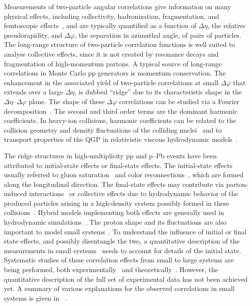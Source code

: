 Measurements of two-particle angular correlations give information on many physical effects, including collectivity, hadronization, fragmentation, and femtoscopic effects~\cite{Lisa:2005dd}, and are typically quantified as a function of $\Delta\eta$, the relative pseudorapidity, and $\Delta\varphi$, the separation in azimuthal angle, of pairs of particles. The long-range structure of two-particle correlation functions is well suited to analyse collective effects, since it is not created by resonance decays and fragmentation of high-momentum partons. A typical source of long-range correlations in Monte Carlo pp generators is momentum conservation. %
The enhancement in the associated yield of two-particle correlations at small $\Delta\varphi$ that extends over a large $\Delta\eta$, is dubbed ``ridge'' due to its characteristic shape in the $\Delta\eta$--$\Delta\varphi$ plane.
The shape of these $\Delta\varphi$ correlations can be studied via a Fourier decomposition~\cite{Poskanzer:1998yz,Voloshin:2008dg}. The second and third order terms are the dominant harmonic coefficients. In heavy-ion collisions, harmonic coefficients can be related to the collision geometry and density fluctuations of the colliding nuclei~\cite{Alver:2010gr,Alver:2010dn,ALICE:2011ab} and to transport properties of the QGP in relativistic viscous hydrodynamic models~\cite{Gale:2012rq,Niemi:2015qia,Shen:2014vra,Bernhard:2016tnd,Bernhard2019}.

The ridge structures in high-multiplicity pp and p--Pb events have been attributed to initial-state effects or final-state effects. The initial-state effects usually referred to gluon saturation~\cite{Dusling:2012cg,Bzdak:2013zma} and color reconnections~\cite{Ortiz:2013yxa,Sarma:2019teo}, which are formed along the longitudinal direction. The final-state effects may contribute via parton-induced interactions~\cite{Arbuzov:2011yr} or collective effects due to hydrodynamic behavior of the produced particles arising in a high-density system possibly formed in these collisions~\cite{Weller:2017tsr,Zhao:2017rgg}. 
Hybrid models implementing both effects are generally used in hydrodynamic simulations~\cite{Greif:2017bnr,Mantysaari:2017cni}. 
The proton shape and its fluctuations are also important to model small systems~\cite{Mantysaari:2017cni}.
To understand the influence of initial or final state effects, and possibly disentangle the two, a quantitative description of the measurements in small systems~\cite{Schenke:2019pmk,Schenke:2020mbo} needs to account for details of the initial state.
Systematic studies of these correlation effects from small to large systems are being performed, both experimentally~\cite{Acharya:2019vdf} and theoretically~\cite{Schenke:2020mbo}.
However, the quantitative description of the full set of experimental data has not been achieved yet.
A summary of various explanations for the observed correlations in small systems is given in ~\cite{Strickland:2018exs,Loizides:2016tew,Nagle:2018nvi}.

